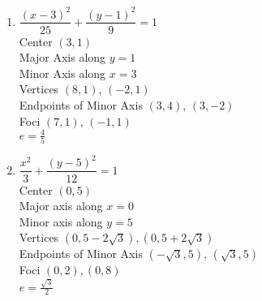 \begin{enumerate}
\begin{multicols}{2}
\end{multicols}

\setcounter{HW}{\value{enumi}}
\end{enumerate}

\begin{multicols}{2}
\begin{enumerate}
\setcounter{enumi}{\value{HW}}

\item  $\dfrac{(x-3)^2}{25} + \dfrac{\left(y-1\right)^2}{9} = 1$\\
Center  $\left(3, 1 \right)$\\
Major Axis along $y=1$\\
Minor Axis along $x=3$\\
Vertices  $\left( 8, 1   \right)$, $(-2, 1)$\\
Endpoints of Minor Axis $\left(3,4\right)$, $\left(3,-2\right)$\\
Foci $\left(7,1 \right)$, $\left(-1, 1\right)$\\
$e = \frac{4}{5}$


\vfill

\columnbreak


\item $\dfrac{x^{2}}{3} + \dfrac{(y - 5)^{2}}{12} = 1$\\
Center $(0, 5)$\\
Major axis along $x = 0$\\
Minor axis along $y = 5$\\
Vertices $(0, 5 - 2\sqrt{3}), (0, 5 + 2\sqrt{3})$\\
Endpoints of Minor Axis $(-\sqrt{3},5)$, $(\sqrt{3},5)$\\
Foci $(0, 2), (0, 8)$\\
$e = \frac{\sqrt{3}}{2}$


\setcounter{HW}{\value{enumi}}
\end{enumerate}
\end{multicols}

